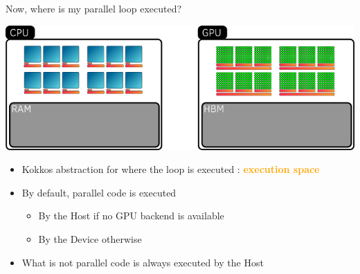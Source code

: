 \documentclass[aspectratio=169]{beamer}
\newcommand{\highlight}[1]{\textcolor{orange}{\textbf{#1}}}
\begin{document}

\begin{frame}{Now, where is my parallel loop executed?}
    \begin{center}
        \includegraphics[width=0.8\linewidth]{execution_space.png}
    \end{center}
    \begin{itemize}
        \item Kokkos abstraction for where the loop is executed : \highlight{execution space}
        \item By default, parallel code is executed
        \begin{itemize}
            \item By the Host if no GPU backend is available
            \item By the Device otherwise
        \end{itemize}
        \item What is not parallel code is always executed by the Host
    \end{itemize}
\end{frame}

\end{document}
